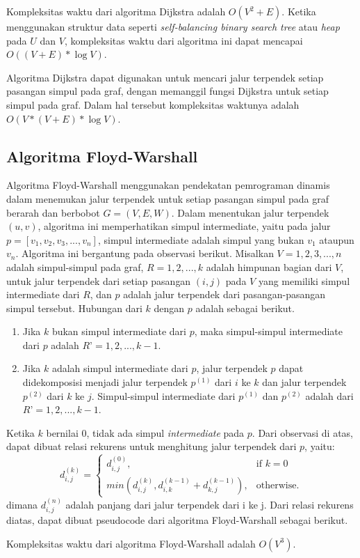     \medskip
    

    Kompleksitas waktu dari algoritma Dijkstra adalah $O(V^{2} + E)$. Ketika menggunakan 
    struktur data seperti \textit{self-balancing binary search tree} atau \textit{heap} 
    pada $U$ dan $V$, kompleksitas waktu dari algoritma ini dapat mencapai 
    $O((V + E) * \log V)$.

    Algoritma Dijkstra dapat digunakan untuk mencari jalur terpendek setiap pasangan 
    simpul pada graf, dengan memanggil fungsi Dijkstra untuk setiap simpul pada graf. 
    Dalam hal tersebut kompleksitas waktunya adalah $O(V*(V + E)* \log V)$.

    \subsection{Algoritma Floyd-Warshall}
    Algoritma Floyd-Warshall menggunakan pendekatan pemrograman dinamis dalam menemukan 
    jalur terpendek untuk setiap pasangan simpul pada graf berarah dan berbobot 
    $G = (V, E, W)$. Dalam menentukan jalur terpendek $(u,v)$, algoritma ini 
    memperhatikan simpul intermediate, yaitu pada jalur 
    $p = [v_{1}, v_{2}, v_{3}, ..., v_{n}]$, simpul intermediate adalah simpul yang 
    bukan $v_{1}$ ataupun $v_{n}$. Algoritma ini bergantung pada observasi berikut. 
    Misalkan $V = {1, 2, 3, ..., n}$ adalah simpul-simpul pada graf, $R = {1, 2, ..., k}$ 
    adalah himpunan bagian dari $V$, untuk jalur terpendek dari setiap pasangan $(i, j)$ 
    pada $V$ yang memiliki simpul intermediate dari $R$, dan $p$ adalah jalur terpendek 
    dari pasangan-pasangan simpul tersebut. Hubungan dari $k$ dengan $p$ adalah sebagai 
    berikut.

    \begin{enumerate}
        \item Jika $k$ bukan simpul intermediate dari $p$, maka simpul-simpul intermediate dari $p$ adalah $R’ = {1, 2, ..., k-1}$.
        \item Jika $k$ adalah simpul intermediate dari $p$, jalur terpendek $p$ dapat didekomposisi menjadi jalur terpendek $p^{(1)}$ dari $i$ ke $k$ 
        dan jalur terpendek $p^{(2)}$ dari $k$ ke $j$. Simpul-simpul intermediate dari $p^{(1)}$ dan $p^{(2)}$ adalah dari $R’ = {1, 2, ..., k-1}$.
    \end{enumerate}

    Ketika $k$ bernilai 0, tidak ada simpul \textit{intermediate} pada $p$. Dari 
    observasi di atas, dapat dibuat relasi rekurens untuk menghitung jalur terpendek 
    dari $p$, yaitu:
    \begin{equation}
        d_{i,j}^{(k)} =
        \begin{cases}
            d_{i,j}^{(0)}, & \text{if } k = 0\\
            min(d_{i,j}^{(k)}, d_{i,k}^{(k-1)} + d_{k,j}^{(k-1)}), & \text{otherwise}.
        \end{cases}
    \end{equation}
    dimana $d_{i,j}^{(n)}$ adalah panjang dari jalur terpendek dari i ke j. Dari relasi rekurens diatas, dapat dibuat pseudocode dari algoritma Floyd-Warshall sebagai berikut.

    \medskip
    

    Kompleksitas waktu dari algoritma Floyd-Warshall adalah $O(V^{3})$.
